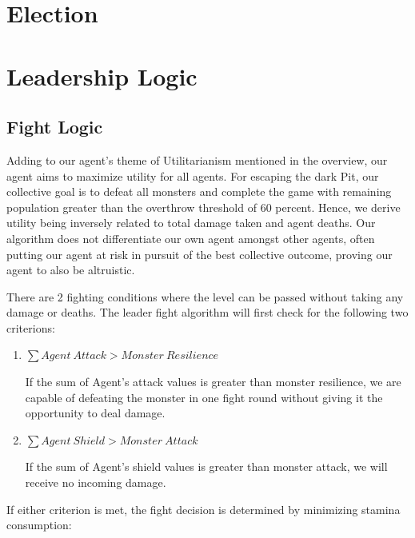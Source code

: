 \section{Election}

\section{Leadership Logic}
\subsection{Fight Logic}
\noindent Adding to our agent's theme of Utilitarianism mentioned in the overview, our agent aims to maximize utility for all agents. For escaping the dark Pit, our collective goal is to defeat all monsters and complete the game with remaining population greater than the overthrow threshold of 60 percent. Hence, we derive utility being inversely related to total damage taken and agent deaths. Our algorithm does not differentiate our own agent amongst other agents, often putting our agent at risk in pursuit of the best collective outcome, proving our agent to also be altruistic.

\noindent 

\noindent There are 2 fighting conditions where the level can be passed without taking any damage or deaths. The leader fight algorithm will first check for the following two criterions: 

\begin{enumerate}
\item  $\sum{Agent~Attack>Monster~Resilience}$
\

\noindent If the sum of Agent's attack values is greater than monster resilience, we are capable of defeating the monster in one fight round without giving it the opportunity to deal damage.

\item  $\sum{Agent~Shield>Monster~Attack}$


\noindent If the sum of Agent's shield values is greater than monster attack, we will receive no incoming damage.
\end{enumerate}
\noindent If either criterion is met, the fight decision is determined by minimizing stamina consumption:

